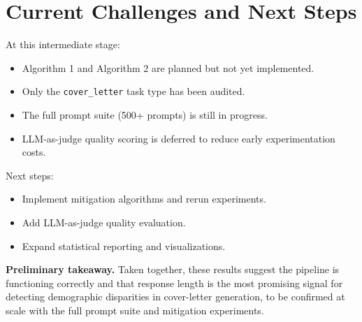 \documentclass{article}
\begin{document}
\section{Current Challenges and Next Steps}
At this intermediate stage:
\begin{itemize}
  \item Algorithm 1 and Algorithm 2 are planned but not yet implemented.
  \item Only the \texttt{cover\_letter} task type has been audited.
  \item The full prompt suite (500+ prompts) is still in progress.
  \item LLM-as-judge quality scoring is deferred to reduce early experimentation costs.
\end{itemize}

Next steps:
\begin{itemize}
  \item Implement mitigation algorithms and rerun experiments.
  \item Add LLM-as-judge quality evaluation.
  \item Expand statistical reporting and visualizations.
\end{itemize}

\textbf{Preliminary takeaway.} Taken together, these results suggest the pipeline is functioning correctly and that response length is the most promising signal for detecting demographic disparities in cover-letter generation, to be confirmed at scale with the full prompt suite and mitigation experiments.
\end{document}
